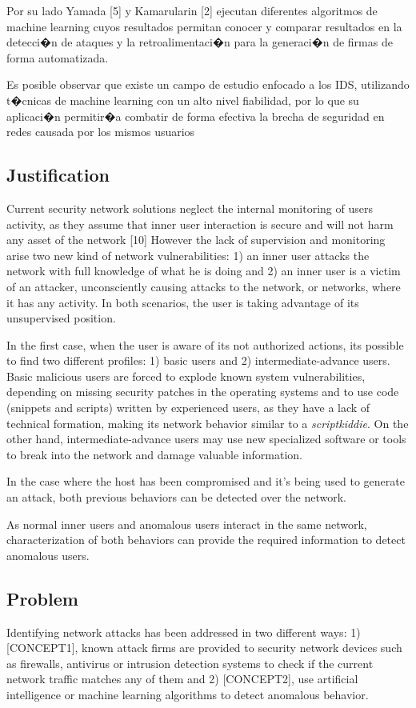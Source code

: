 \documentclass{article}
\begin{document}
Por su lado Yamada [5] y Kamarularin [2] ejecutan diferentes algoritmos de machine learning cuyos resultados permitan conocer y comparar resultados en la detecci�n de ataques y la retroalimentaci�n para la generaci�n de firmas de forma automatizada.

Es posible observar que existe un campo de estudio enfocado a los IDS, utilizando t�cnicas de machine learning con un alto nivel fiabilidad, por lo que su aplicaci�n permitir�a combatir de forma efectiva la brecha de seguridad en redes causada por los mismos usuarios




\subsection{Justification} %
Current security network solutions neglect  the internal monitoring of users activity, as they assume that inner user interaction is secure and will not harm any asset of the network [10] However the lack of supervision and monitoring arise two new kind of network vulnerabilities: 1) an inner user attacks the network with full knowledge of what he is doing and 2) an inner user is a victim of an attacker, unconsciently causing attacks to the network, or networks, where it has any activity. In both scenarios, the user is taking advantage of its unsupervised position.

In the first case, when the user is aware of its not authorized actions, its possible to find two different profiles: 1) basic users and 2) intermediate-advance users.
Basic malicious users are forced to explode known system vulnerabilities, depending on missing security patches in the operating systems and to use code (snippets and scripts) written by experienced users, as they have a lack of technical formation, making its network behavior similar to a \textit{scriptkiddie}. On the other hand, intermediate-advance users may use new specialized software or tools to break into the network and damage valuable information.

In the case where the host has been compromised and it's being used to generate an attack, both previous behaviors can be detected over the network.

As normal inner users and anomalous users interact in the same network, characterization of both behaviors can provide the required information to detect anomalous users.



\subsection{Problem} %
Identifying network attacks has been addressed in two different ways: 1) [CONCEPT1], known attack firms are provided to security network devices such as firewalls, antivirus or intrusion detection systems to check if the current network traffic matches any of them and 2) [CONCEPT2], use artificial intelligence or machine learning algorithms to detect anomalous behavior.
\end{document}
